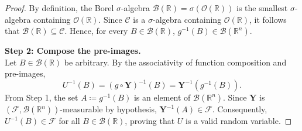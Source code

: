 \documentclass[11pt, letterpaper]{article}
\theoremstyle{definition}
\theoremstyle{remark}
\newcommand{\R}{\mathbb{R}}
\newcommand{\F}{\mathcal{F}}
\begin{document}
\begin{proof}
By definition, the Borel $\sigma$-algebra $\mathcal{B}(\R) = \sigma(\mathcal{O}(\R))$ is the smallest $\sigma$-algebra containing $\mathcal{O}(\R)$. Since $\mathcal{C}$ is a $\sigma$-algebra containing $\mathcal{O}(\R)$, it follows that $\mathcal{B}(\R) \subseteq \mathcal{C}$. Hence, for every $B \in \mathcal{B}(\R)$, $g^{-1}(B) \in \mathcal{B}(\R^n)$.

\textbf{Step 2: Compose the pre-images.} \\ \relax
Let $B \in \mathcal{B}(\R)$ be arbitrary. By the associativity of function composition and pre-images,
\[
    U^{-1}(B) = (g \circ \mathbf{Y})^{-1}(B) = \mathbf{Y}^{-1}\left(g^{-1}(B)\right).
\]
From Step 1, the set $A \coloneqq g^{-1}(B)$ is an element of $\mathcal{B}(\R^n)$. Since $\mathbf{Y}$ is $(\F, \mathcal{B}(\R^n))$-measurable by hypothesis, $\mathbf{Y}^{-1}(A) \in \F$. Consequently, $U^{-1}(B) \in \F$ for all $B \in \mathcal{B}(\R)$, proving that $U$ is a valid random variable.
\end{proof}
\end{document}
